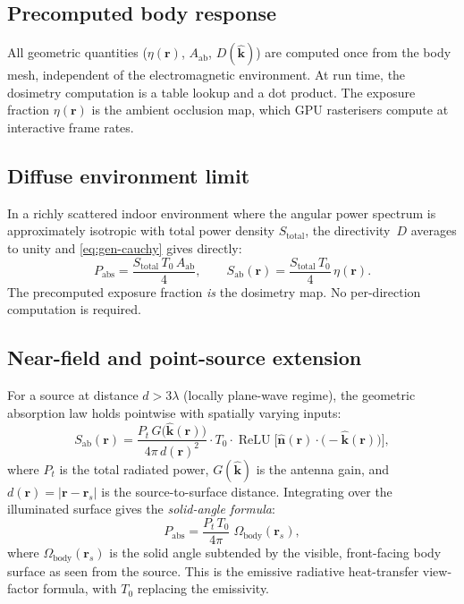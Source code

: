 \documentclass[11pt,a4paper]{article}
\theoremstyle{definition}
\newcommand{\khat}{\hat{\bm{k}}}
\newcommand{\nhat}{\hat{\bm{n}}}
\newcommand{\rr}{\mathbf{r}}
\newcommand{\Sab}{S_{\mathrm{ab}}}
\newcommand{\Aab}{A_{\mathrm{ab}}}
\DeclareMathOperator{\ReLU}{ReLU}
\begin{document}
\subsection{Precomputed body response}

All geometric quantities ($\eta(\rr)$, $\Aab$, $D(\khat)$) are
computed once from the body mesh, independent of the electromagnetic
environment.  At run time, the dosimetry computation is a table lookup
and a dot product.  The exposure fraction $\eta(\rr)$ is the ambient
occlusion map, which GPU rasterisers compute at interactive frame rates.

\subsection{Diffuse environment limit}

In a richly scattered indoor environment where the angular power
spectrum is approximately isotropic with total power density
$S_{\mathrm{total}}$, the directivity~$D$ averages to unity and
\cref{eq:gen-cauchy} gives directly:
\begin{equation}\label{eq:diffuse}
  P_{\mathrm{abs}} = \frac{S_{\mathrm{total}}\,T_0\,\Aab}{4},
  \qquad
  \Sab(\rr) = \frac{S_{\mathrm{total}}\,T_0}{4}\,\eta(\rr).
\end{equation}
The precomputed exposure fraction \emph{is} the dosimetry map.  No
per-direction computation is required.

\subsection{Near-field and point-source extension}

For a source at distance $d>3\lambda$ (locally plane-wave regime),
the geometric absorption law holds pointwise with spatially varying
inputs:
\begin{equation}\label{eq:Sab-point}
  \Sab(\rr) = \frac{P_t\,G\!\bigl(\khat(\rr)\bigr)}{4\pi\,d(\rr)^2}
    \cdot T_0 \cdot
    \ReLU\!\bigl[\nhat(\rr)\cdot\bigl(-\khat(\rr)\bigr)\bigr],
\end{equation}
where $P_t$ is the total radiated power, $G(\khat)$ is the antenna gain,
and $d(\rr)=|\rr-\rr_s|$ is the source-to-surface distance.  Integrating
over the illuminated surface gives the \emph{solid-angle formula}:
\begin{equation}\label{eq:solid-angle}
  \boxed{P_{\mathrm{abs}}
    = \frac{P_t\,T_0}{4\pi}\;\Omega_{\mathrm{body}}(\rr_s),}
\end{equation}
where $\Omega_{\mathrm{body}}(\rr_s)$ is the solid angle subtended by
the visible, front-facing body surface as seen from the source.  This
is the emissive radiative heat-transfer view-factor formula, with
$T_0$ replacing the emissivity.
\end{document}
